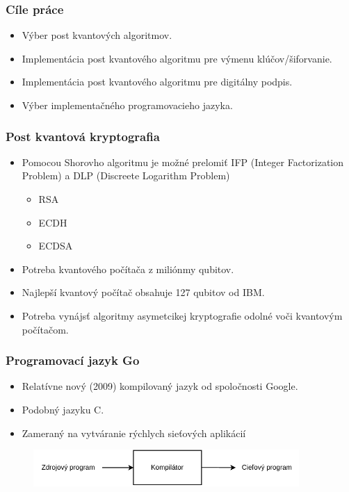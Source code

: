 \documentclass[%
  14pt,       				%
	t,                  %
	aspectratio=1610,   %
	unicode,						%
]{beamer}				    	%
\begin{document}
\disablenavigationsymbols

\maketitle


\begin{frame} 
	\frametitle{Cíle práce}
	\begin{itemize}
		\item Výber post kvantových algoritmov.
		\item Implementácia post kvantového algoritmu pre výmenu klúčov/šiforvanie.
		\item Implementácia post kvantového algoritmu pre digitálny podpis.
		\item Výber implementačného programovacieho jazyka.
	\end{itemize}
\end{frame}

\begin{frame} 
	\frametitle{Post kvantová kryptografia}
	\begin{itemize}
		\item Pomocou Shorovho algoritmu je možné prelomiť IFP (Integer Factorization Problem) a DLP (Discreete Logarithm Problem)
		      \begin{itemize}
			      \item RSA
			      \item ECDH
			      \item ECDSA
		      \end{itemize}
		\item Potreba kvantového počítača z miliónmy qubitov.
		\item Najlepší kvantový počítač obsahuje 127 qubitov od IBM.
		\item Potreba vynájsť algoritmy asymetcikej kryptografie odolné voči kvantovým počítačom.
	\end{itemize}
\end{frame}

\begin{frame} 
	\frametitle{Programovací jazyk Go}
	\begin{itemize}
		\item Relatívne nový (2009) kompilovaný jazyk od spoločnosti Google.
		\item Podobný jazyku C.
		\item Zameraný na vytváranie rýchlych sieťových aplikácií
	\end{itemize}
	\begin{figure}[htbp]
		\centering
		\includegraphics[width=0.9\textwidth]{pictures/compiler_sk.pdf}
	\end{figure}
\end{frame}
\end{document}
